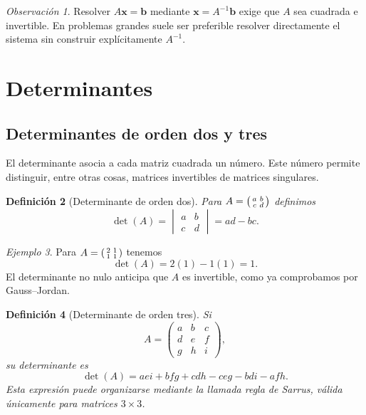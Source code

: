 \documentclass[12pt]{article}
\newtheorem{definicion}{Definición}[section]
\theoremstyle{remark}
\newtheorem{observacion}[definicion]{Observación}
\newtheorem{ejemplo}[definicion]{Ejemplo}
\newcommand{\vect}[1]{\boldsymbol{#1}}
\begin{document}
\begin{observacion}
Resolver $A\vect{x}=\vect{b}$ mediante $\vect{x}=A^{-1}\vect{b}$ exige que $A$ sea cuadrada e invertible. En problemas grandes suele ser preferible resolver directamente el sistema sin construir explícitamente $A^{-1}$.
\end{observacion}

\section{Determinantes}
\subsection{Determinantes de orden dos y tres}
El determinante asocia a cada matriz cuadrada un número. Este número permite distinguir, entre otras cosas, matrices invertibles de matrices singulares.

\begin{definicion}[Determinante de orden dos]
Para $A=\begin{psmallmatrix}a&b\\c&d\end{psmallmatrix}$ definimos
\[
\det(A)=\begin{vmatrix}a&b\\c&d\end{vmatrix}=ad-bc.
\]
\end{definicion}
\begin{ejemplo}
Para $A=\begin{psmallmatrix}2&1\\1&1\end{psmallmatrix}$ tenemos
\[
\det(A)=2(1)-1(1)=1.
\]
El determinante no nulo anticipa que $A$ es invertible, como ya comprobamos por Gauss--Jordan.
\end{ejemplo}

\begin{definicion}[Determinante de orden tres]
Si
\[
A=\begin{pmatrix}a&b&c\\d&e&f\\g&h&i\end{pmatrix},
\]
su determinante es
\[
\boxed{\det(A)=aei+bfg+cdh-ceg-bdi-afh.}
\]
Esta expresión puede organizarse mediante la llamada \emph{regla de Sarrus}, válida únicamente para matrices $3\times3$.
\end{definicion}
\end{document}

